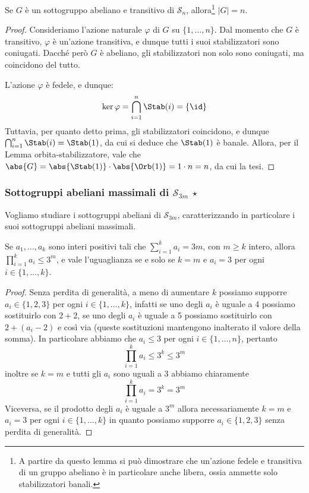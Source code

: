 \documentclass[11pt]{scrartcl}
\begin{document}
	\begin{lemma}
		\label{lemma1.54}
		Se $G$ è un sottogruppo abeliano e transitivo di $\mathcal{S}_n$,
		allora\footnote{
			A partire da questo lemma si può dimostrare che un'azione fedele e
			transitiva di un gruppo abeliano è in particolare anche libera, ossia
			ammette solo stabilizzatori banali.
		} $\lvert G \rvert = n$.
	\end{lemma}
	
	\begin{proof}
		Consideriamo l'azione naturale $\varphi$ di $G$ su $\{1, \ldots, n\}$. Dal momento
		che $G$ è transitivo, $\varphi$ è un'azione transitiva, e dunque tutti i suoi
		stabilizzatori sono coniugati. Dacché però $G$ è abeliano, gli stabilizzatori
		non solo sono coniugati, ma coincidono del tutto. \medskip
		
		
		L'azione $\varphi$ è fedele, e dunque:
		\[
		\ker \varphi = \bigcap_{i=1}^{n} \Stab(i) = \{\id\}
		\]
		Tuttavia, per quanto detto prima, gli stabilizzatori coincidono, e dunque
		$\bigcap_{i=1}^{n} \Stab(i) = \Stab(1)$, da cui si deduce che $\Stab(1)$ è
		banale. Allora, per il Lemma orbita-stabilizzatore, vale che
		$\abs{G} = \abs{\Stab(1)} \cdot \abs{\Orb(1)} = 1 \cdot n = n$, da cui la tesi.
	\end{proof}
	
	\subsubsection{Sottogruppi abeliani massimali di $\mathcal{S}_{3m}$ $\star$}
	
	Vogliamo studiare i sottogruppi abeliani di $\mathcal{S}_{3m}$, caratterizzando in particolare
	i suoi sottogruppi abeliani massimali.
	
	\begin{lemma}
		\label{lemma1.55}
		Se $a_1, \ldots, a_k$ sono interi positivi tali che $\displaystyle
		\sum_{i = 1}^k a_i = 3m$,
		con $m \geqslant k$ intero, allora $\displaystyle
		\prod_{i = 1}^k a_i \leq 3^m$, 
		e vale l'uguaglianza se e solo se $k = m$ e $a_i = 3$ per ogni $i \in \{1, \ldots, k\}$.
	\end{lemma}
	
	\begin{proof}
		Senza perdita di generalità, a meno di aumentare $k$ possiamo supporre
		$a_i \in \{1, 2, 3\}$ per ogni $i \in \{1, \ldots, k\}$, infatti se 
		uno degli $a_i$ è uguale a 4 possiamo sostituirlo con $2 + 2$, se uno degli
		$a_i$ è uguale a 5 possiamo sostituirlo con $2 + (a_i - 2)$ e così via
		(queste sostituzioni mantengono inalterato il valore della somma).
		In particolare abbiamo che $a_i \leqslant 3$ per ogni $i \in \{1, \ldots, n\}$,
		pertanto 
		\[
		\prod_{i = 1}^k a_i \leq 3^k \leq 3^m
		\]
		inoltre se $k = m$ e tutti gli $a_i$ sono uguali a 3 abbiamo chiaramente
		\[
		\prod_{i = 1}^k a_i = 3^k = 3^m
		\]
		Viceversa, se il prodotto degli $a_i$ è uguale a $3^m$ allora necessariamente
		$k = m$ e $a_i = 3$ per ogni $i \in \{1, \ldots, k\}$ in quanto possiamo
		supporre $a_i \in \{1, 2, 3\}$ senza perdita di generalità.
	\end{proof}
	
\end{document}
